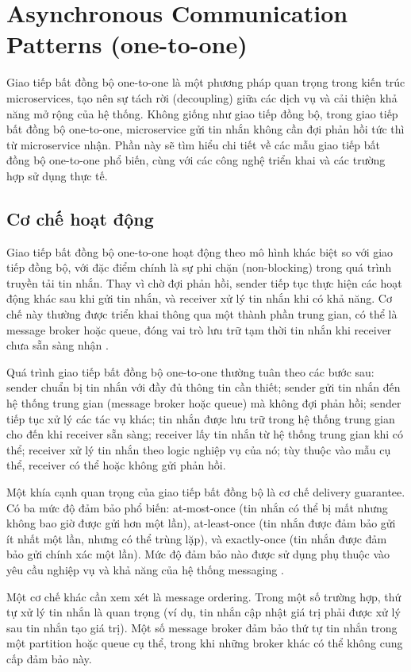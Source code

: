 \section{Asynchronous Communication Patterns (one-to-one)}
Giao tiếp bất đồng bộ one-to-one là một phương pháp quan trọng trong kiến trúc microservices, tạo nên sự tách rời (decoupling) giữa các dịch vụ và cải thiện khả năng mở rộng của hệ thống. Không giống như giao tiếp đồng bộ, trong giao tiếp bất đồng bộ one-to-one, microservice gửi tin nhắn không cần đợi phản hồi tức thì từ microservice nhận. Phần này sẽ tìm hiểu chi tiết về các mẫu giao tiếp bất đồng bộ one-to-one phổ biến, cùng với các công nghệ triển khai và các trường hợp sử dụng thực tế.

\subsection{Cơ chế hoạt động}
Giao tiếp bất đồng bộ one-to-one hoạt động theo mô hình khác biệt so với giao tiếp đồng bộ, với đặc điểm chính là sự phi chặn (non-blocking) trong quá trình truyền tải tin nhắn. Thay vì chờ đợi phản hồi, sender tiếp tục thực hiện các hoạt động khác sau khi gửi tin nhắn, và receiver xử lý tin nhắn khi có khả năng. Cơ chế này thường được triển khai thông qua một thành phần trung gian, có thể là message broker hoặc queue, đóng vai trò lưu trữ tạm thời tin nhắn khi receiver chưa sẵn sàng nhận \cite{hohpe2004}.

Quá trình giao tiếp bất đồng bộ one-to-one thường tuân theo các bước sau: sender chuẩn bị tin nhắn với đầy đủ thông tin cần thiết; sender gửi tin nhắn đến hệ thống trung gian (message broker hoặc queue) mà không đợi phản hồi; sender tiếp tục xử lý các tác vụ khác; tin nhắn được lưu trữ trong hệ thống trung gian cho đến khi receiver sẵn sàng; receiver lấy tin nhắn từ hệ thống trung gian khi có thể; receiver xử lý tin nhắn theo logic nghiệp vụ của nó; tùy thuộc vào mẫu cụ thể, receiver có thể hoặc không gửi phản hồi.

Một khía cạnh quan trọng của giao tiếp bất đồng bộ là cơ chế delivery guarantee. Có ba mức độ đảm bảo phổ biến: at-most-once (tin nhắn có thể bị mất nhưng không bao giờ được gửi hơn một lần), at-least-once (tin nhắn được đảm bảo gửi ít nhất một lần, nhưng có thể trùng lặp), và exactly-once (tin nhắn được đảm bảo gửi chính xác một lần). Mức độ đảm bảo nào được sử dụng phụ thuộc vào yêu cầu nghiệp vụ và khả năng của hệ thống messaging \cite{newman2015}.

Một cơ chế khác cần xem xét là message ordering. Trong một số trường hợp, thứ tự xử lý tin nhắn là quan trọng (ví dụ, tin nhắn cập nhật giá trị phải được xử lý sau tin nhắn tạo giá trị). Một số message broker đảm bảo thứ tự tin nhắn trong một partition hoặc queue cụ thể, trong khi những broker khác có thể không cung cấp đảm bảo này.

